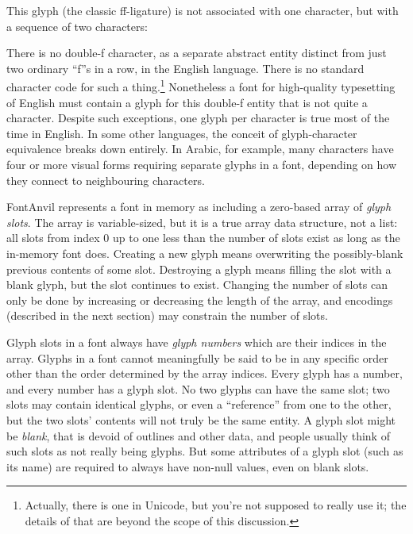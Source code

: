 This glyph (the classic ff-ligature) is not associated with one character,
but with a sequence of two characters:

\begin{center}
\scalebox{5}{ff}
\end{center}

There is no double-f character, as a separate abstract entity distinct from
just two ordinary ``f''s in a row, in the English language.  There is no
standard character code for such a thing.\footnote{Actually, there is one in
Unicode, but you're not supposed to really use it; the details of that are
beyond the scope of this discussion.} Nonetheless a font for high-quality
typesetting of English must contain a glyph for this double-f entity
that is not quite a character.  Despite such exceptions, one glyph per
character is true most of the time in English.  In some other languages, the
conceit of glyph-character equivalence breaks down entirely.  In Arabic, for
example, many characters have four or more visual forms requiring
separate glyphs in a font, depending on how they connect to neighbouring
characters.

FontAnvil represents a font in memory as including a zero-based array of
\emph{glyph slots}.  The array is variable-sized, but it is a true array
data structure, not a list: all slots from index 0 up to one less than the
number of slots exist as long as the in-memory font does.  Creating a new
glyph means overwriting the possibly-blank previous contents of some slot. 
Destroying a glyph means filling the slot with a blank glyph, but the slot
continues to exist.  Changing the number of slots can only be done by
increasing or decreasing the length of the array, and encodings (described
in the next section) may constrain the number of slots.

Glyph slots in a font always have \emph{glyph numbers} which are their
indices in the array.  Glyphs in a font cannot meaningfully be said to be in
any specific order other than the order determined by the array indices. 
Every glyph has a number, and every number has a glyph slot.  No two glyphs
can have the same slot; two slots may contain identical glyphs, or even a
``reference'' from one to the other, but the two slots' contents will not
truly be the same entity.  A glyph slot might be \emph{blank}, that is
devoid of outlines and other data, and people usually think of such slots as
not really being glyphs.  But some attributes of a glyph slot (such as its
name) are required to always have non-null values, even on blank slots.

